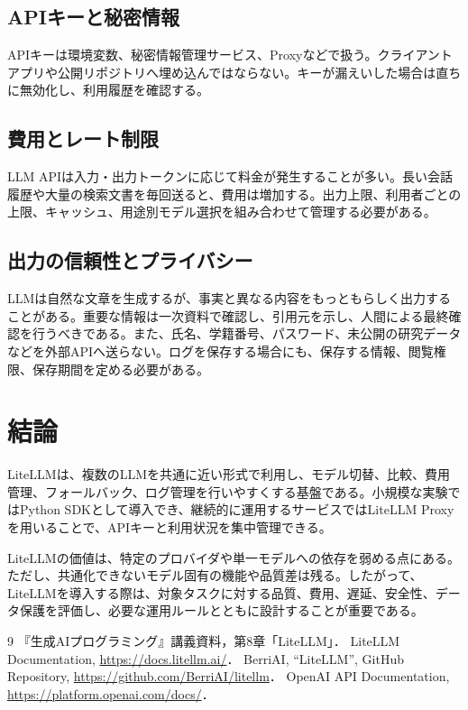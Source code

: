 \documentclass[a4paper,11pt]{jsarticle}
\begin{document}
\subsection{APIキーと秘密情報}

APIキーは環境変数、秘密情報管理サービス、Proxyなどで扱う。クライアントアプリや公開リポジトリへ埋め込んではならない。キーが漏えいした場合は直ちに無効化し、利用履歴を確認する。

\subsection{費用とレート制限}

LLM APIは入力・出力トークンに応じて料金が発生することが多い。長い会話履歴や大量の検索文書を毎回送ると、費用は増加する。出力上限、利用者ごとの上限、キャッシュ、用途別モデル選択を組み合わせて管理する必要がある。

\subsection{出力の信頼性とプライバシー}

LLMは自然な文章を生成するが、事実と異なる内容をもっともらしく出力することがある。重要な情報は一次資料で確認し、引用元を示し、人間による最終確認を行うべきである。また、氏名、学籍番号、パスワード、未公開の研究データなどを外部APIへ送らない。ログを保存する場合にも、保存する情報、閲覧権限、保存期間を定める必要がある。

\section{結論}

LiteLLMは、複数のLLMを共通に近い形式で利用し、モデル切替、比較、費用管理、フォールバック、ログ管理を行いやすくする基盤である。小規模な実験ではPython SDKとして導入でき、継続的に運用するサービスではLiteLLM Proxyを用いることで、APIキーと利用状況を集中管理できる。

LiteLLMの価値は、特定のプロバイダや単一モデルへの依存を弱める点にある。ただし、共通化できないモデル固有の機能や品質差は残る。したがって、LiteLLMを導入する際は、対象タスクに対する品質、費用、遅延、安全性、データ保護を評価し、必要な運用ルールとともに設計することが重要である。

\begin{thebibliography}{9}
 『生成AIプログラミング』講義資料，第8章「LiteLLM」．
 LiteLLM Documentation, \url{https://docs.litellm.ai/}．
 BerriAI, ``LiteLLM'', GitHub Repository, \url{https://github.com/BerriAI/litellm}．
 OpenAI API Documentation, \url{https://platform.openai.com/docs/}．
\end{thebibliography}
\end{document}
